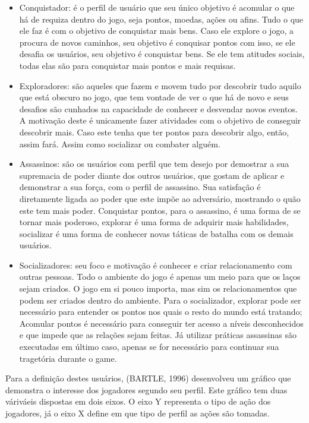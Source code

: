 \begin{itemize}
    \item Conquistador: é o perfil de usuário que seu único objetivo é acomular o
        que há de requiza dentro do jogo, seja pontos, moedas, ações ou afins.
        Tudo o que ele faz é com o objetivo de conquistar mais bens. Caso ele explore
        o jogo, a procura de novos caminhos, seu objetivo é conquisar pontos com
        isso, se ele desafia os usuários, seu objetivo é conquistar bens. Se ele
        tem atitudes sociais, todas elas são para conquistar mais pontos e mais requisas.
    \item Exploradores: são aqueles que fazem e movem tudo por descobrir tudo aquilo
        que está obscuro no jogo, que tem vontade de ver o que há de novo e seus desafios
        são cunhados na capacidade de conhecer e desvendar novos eventos. A motivação
        deste é unicamente fazer atividades com o objetivo de conseguir descobrir mais.
        Caso este tenha que ter pontos para descobrir algo, então, assim fará. Assim
        como socializar ou combater alguém.
    \item Assassinos: são os usuários com perfil que tem desejo por demostrar a sua
        supremacia de poder diante dos outros usuários, que gostam de aplicar
        e demonstrar a sua força, com o perfil de assassino. Sua satisfação
        é diretamente ligada ao poder que este impõe ao adversário, mostrando
        o quão este tem mais poder. Conquistar pontos, para o assassino, é uma forma
        de se tornar mais poderoso, explorar é uma forma de adquirir mais habilidades,
        socializar é uma forma de conhecer novas táticas de batalha com os demais
        usuários.
    \item Socializadores: seu foco e motivação é conhecer e criar relacionamento
        com outras pessoas. Todo o ambiente do jogo é apenas um meio para que
        os laços sejam criados. O jogo em si pouco importa, mas sim os relacionamentos
        que podem ser criados dentro do ambiente. Para o socializador, explorar pode
        ser necessário para entender os pontos nos quais o resto do mundo está tratando;
        Acomular pontos é necessário para conseguir ter acesso a níveis desconhecidos
        e que impede que as relações sejam feitas. Já utilizar práticas assassinas são
        executadas em último caso, apenas se for necessário para continuar sua tragetória
        durante o game.
\end{itemize}

Para a definição destes usuários, (BARTLE, 1996) desenvolveu um gráfico que demonstra o
interesse dos jogadores segundo seu perfil. Este gráfico tem duas váriváeis dispostas
em dois eixos. O eixo Y representa o tipo de ação dos jogadores, já o eixo X define
em que tipo de perfil as ações são tomadas.

